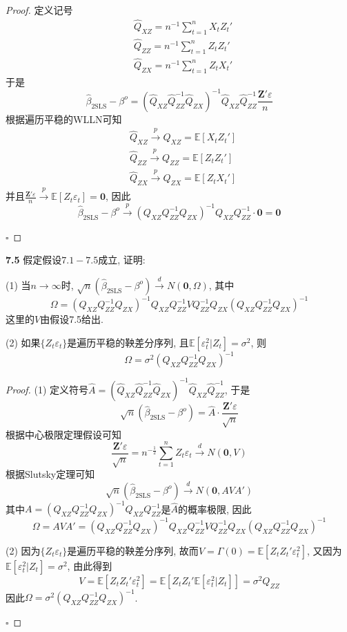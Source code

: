 \documentclass[cn,12pt,math=mtpro2,citestyle=gb7714-2015,bibstyle=gb7714-2015,twocol,mode=simple]{elegantbook}
\newcommand{\E}{\mathbb{E}}
\newcommand{\btls}{\hat{\beta}_{\text{2SLS}}}
\newcommand{\QXZ}{\hat{Q}_{XZ}}
\newcommand{\QZZ}{\hat{Q}_{ZZ}}
\newcommand{\QZX}{\hat{Q}_{ZX}}
\begin{document}
\begin{proof}
  定义记号
  \begin{align*}
  &\hat{Q}_{XZ}=\displaystyle n^{-1}\sum_{t=1}^{n}X_tZ_t' \\
   &\hat{Q}_{ZZ}=\displaystyle n^{-1}\sum_{t=1}^{n}Z_tZ_t'\\
   &\hat{Q}_{ZX}=\displaystyle n^{-1}\sum_{t=1}^{n}Z_tX_t'
  \end{align*}
  于是
  $$\btls-\beta^o=\left(\QXZ\QZZ^{-1}\QZX\right)^{-1}\QXZ\QZZ^{-1}\frac{\mathbf{Z}'\varepsilon}{n}$$
  根据遍历平稳的WLLN可知
  \begin{align*}
  &\QXZ\xrightarrow{p} Q_{XZ}=\E[X_tZ_t'] \\
  &\QZZ\xrightarrow{p} Q_{ZZ}=\E[Z_tZ_t'] \\
  &\QZX\xrightarrow{p} Q_{ZX}=\E[Z_tX_t']
  \end{align*}
  并且$\displaystyle\frac{\mathbf{Z}'\varepsilon}{n}\xrightarrow{p}\E[Z_t\varepsilon_t]=\mathbf{0}$, 因此
  $$\btls-\beta^o\xrightarrow{p} \left(Q_{XZ}Q_{ZZ}^{-1}Q_{ZX}\right)^{-1}Q_{XZ}Q_{ZZ}^{-1}\cdot\mathbf{0}=\mathbf{0}$$

  $\square$
\end{proof}

\textbf{7.5} 假定假设$7.1-7.5$成立, 证明:

(1) 当$n\to\infty$时, $\sqrt{n}(\btls-\beta^o)\xrightarrow{d} N(\mathbf{0},\Omega)$, 其中
$$\Omega=(Q_{XZ}Q_{ZZ}^{-1}Q_{ZX})^{-1}Q_{XZ}Q_{ZZ}^{-1}VQ_{ZZ}^{-1}Q_{ZX}(Q_{XZ}Q_{ZZ}^{-1}Q_{ZX})^{-1}$$
这里的$V$由假设7.5给出.

(2) 如果$\{Z_t\varepsilon_t\}$是遍历平稳的鞅差分序列, 且$\E[\varepsilon_t^2|Z_t]=\sigma^2$, 则
$$\Omega=\sigma^2(Q_{XZ}Q_{ZZ}^{-1}Q_{ZX})^{-1}$$

\begin{proof}
  (1) 定义符号$\hat{A}=(\QXZ\QZZ^{-1}\QZX)^{-1}\QXZ\QZZ^{-1}$, 于是
  $$\sqrt{n}(\btls-\beta^o)=\hat{A}\cdot\frac{\mathbf{Z}'\varepsilon}{\sqrt{n}}$$
  根据中心极限定理假设可知
  $$\frac{\mathbf{Z}'\varepsilon}{\sqrt{n}}=n^{-\frac{1}{2}}\sum_{t=1}^{n}Z_t\varepsilon_t\xrightarrow{d} N(\mathbf{0},V)$$
  根据Slutsky定理可知
  $$\sqrt{n}(\btls-\beta^o)\xrightarrow{d} N(\mathbf{0},AVA')$$
  其中$A=(Q_{XZ}Q_{ZZ}^{-1}Q_{ZX})^{-1}Q_{XZ}Q_{ZZ}^{-1}$是$\hat{A}$的概率极限, 因此
  $$\Omega=AVA'=(Q_{XZ}Q_{ZZ}^{-1}Q_{ZX})^{-1}Q_{XZ}Q_{ZZ}^{-1}VQ_{ZZ}^{-1}Q_{ZX}(Q_{XZ}Q_{ZZ}^{-1}Q_{ZX})^{-1}$$

  (2) 因为$\{Z_t\varepsilon_t\}$是遍历平稳的鞅差分序列, 故而$V=\Gamma(0)=\E[Z_tZ_t'\varepsilon_t^2]$, 又因为$\E[\varepsilon_t^2|Z_t]=\sigma^2$, 由此得到
  $$V=\E[Z_tZ_t'\varepsilon_t^2]=\E[Z_tZ_t'\E[\varepsilon_t^2|Z_t]]=\sigma^2Q_{ZZ}$$
  因此$\Omega=\sigma^2(Q_{XZ}Q_{ZZ}^{-1}Q_{ZX})^{-1}$.

  $\square$
\end{proof}
\end{document}
